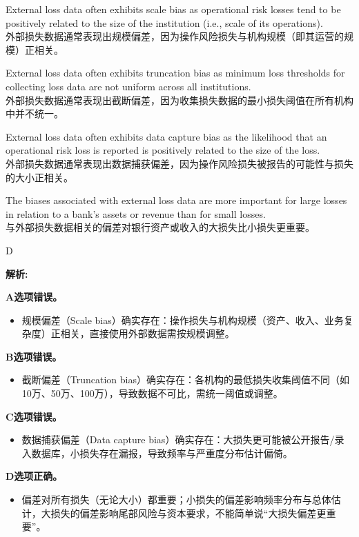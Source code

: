\documentclass{article}
\newenvironment{explanation}
{\textbf{解析:}\par}
{\par}
\begin{document}
\begin{choices}
    \item External loss data often exhibits scale bias as operational risk losses tend to be positively related to the size of the institution (i.e., scale of its operations).\\外部损失数据通常表现出规模偏差，因为操作风险损失与机构规模（即其运营的规模）正相关。
    \item External loss data often exhibits truncation bias as minimum loss thresholds for collecting loss data are not uniform across all institutions.\\外部损失数据通常表现出截断偏差，因为收集损失数据的最小损失阈值在所有机构中并不统一。
    \item External loss data often exhibits data capture bias as the likelihood that an operational risk loss is reported is positively related to the size of the loss.\\外部损失数据通常表现出数据捕获偏差，因为操作风险损失被报告的可能性与损失的大小正相关。
    \item The biases associated with external loss data are more important for large losses in relation to a bank's assets or revenue than for small losses.
    \\与外部损失数据相关的偏差对银行资产或收入的大损失比小损失更重要。
\end{choices}

\begin{correctanswer}
    D
\end{correctanswer}
\begin{explanation}
    \textbf{A选项错误。}
    \begin{itemize}
        \item 规模偏差（Scale bias）确实存在：操作损失与机构规模（资产、收入、业务复杂度）正相关，直接使用外部数据需按规模调整。
    \end{itemize}

    \textbf{B选项错误。}
    \begin{itemize}
        \item 截断偏差（Truncation bias）确实存在：各机构的最低损失收集阈值不同（如10万、50万、100万），导致数据不可比，需统一阈值或调整。
    \end{itemize}

    \textbf{C选项错误。}
    \begin{itemize}
        \item 数据捕获偏差（Data capture bias）确实存在：大损失更可能被公开报告/录入数据库，小损失存在漏报，导致频率与严重度分布估计偏倚。
    \end{itemize}

    \textbf{D选项正确。}
    \begin{itemize}
        \item 偏差对所有损失（无论大小）都重要；小损失的偏差影响频率分布与总体估计，大损失的偏差影响尾部风险与资本要求，不能简单说“大损失偏差更重要”。
    \end{itemize}
\end{explanation}
\end{document}
